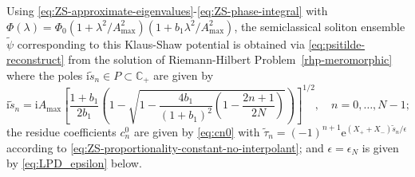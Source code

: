 \documentclass[12pt]{amsart}
\numberwithin{equation}{section}
\newcommand{\ee}{\mathrm{e}}
\newcommand{\ii}{\mathrm{i}}
\newcommand{\eps}{\epsilon}
\begin{document}
Using \eqref{eq:ZS-approximate-eigenvalues}-\eqref{eq:ZS-phase-integral} with $\Phi(\lambda)=\Phi_0(1+\lambda^2/A_\mathrm{max}^2)(1+b_1\lambda^2/A_\mathrm{max}^2)$, the semiclassical soliton ensemble $\widetilde \psi$ corresponding to this Klaus-Shaw potential is obtained via \eqref{eq:psitilde-reconstruct} from the solution of Riemann-Hilbert Problem~\ref{rhp-meromorphic} where the poles $\ii \widetilde{s}_n\in P\subset\mathbb{C}_+$ are given by
\begin{equation} 
	\ii \widetilde{s}_n = \ii A_\mathrm{max} \left[ \frac{1+b_1}{2b_1} \left(  1- \sqrt{ 1 -  \frac{4 b_1}{(1+b_1)^2}   \left(1 - \frac{2n+1}{2N} \right)} \right)\right]^{1/2}, \quad n = 0 , \dots, N-1;
\end{equation}
the residue coefficients $c_n^0$ are given by \eqref{eq:cn0} with $\widetilde{\tau}_n = (-1)^{n+1} \ee^{(X_+ + X_-) \widetilde{s}_n/\eps}$ according to \eqref{eq:ZS-proportionality-constant-no-interpolant}; and $\eps = \eps_N$ is given by \eqref{eq:LPD_epsilon} below.
\end{document}

